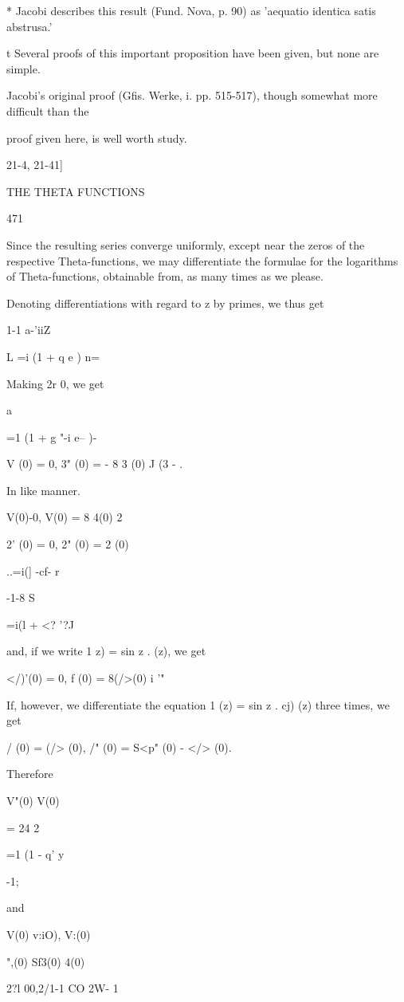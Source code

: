 * Jacobi describes this result (Fund. Nova, p. 90) as 'aequatio
identica satis abstrusa.'

t Several proofs of this important proposition have been given, but
none are simple.

Jacobi's original proof (Gfis. Werke, i. pp. 515-517), though somewhat
more difficult than the

proof given here, is well worth study.

21-4, 21-41]

THE THETA FUNCTIONS

471

Since the resulting series converge uniformly, except near the zeros
of the respective Theta-functions, we may differentiate the formulae
for the logarithms of Theta-functions, obtainable from, as many
times as we please.

Denoting differentiations with regard to z by primes, we thus get


1-1 a-'iiZ

L =i (1 + q e ) n=\

Making 2r 0, we get

a%

=1 (1 + g "-i e-- )-

V (0) = 0, 3" (0) = - 8 3 (0) J (3 - .

In like manner.

V(0)-0, V(0) = 8 4(0) 2

 2' (0) = 0, 2" (0) = 2 (0)

..=i(] -cf- r

-1-8 S

 =i(l + <? '?J

and, if we write 1 z) = sin z . (z), we get

</)'(0) = 0, f (0) = 8(/>(0) i '"

If, however, we differentiate the equation 1 (z) = sin z . cj) (z)
three times, we get

 / (0) = (/> (0), /" (0) = S<p" (0) - </> (0).

Therefore

V"(0) V(0)

= 24 2

=1 (1 - q' y

-1;

and

V(0) v:iO), V:(0)

",(0) Sf3(0) 4(0)

 2?l 00,2/1-1 CO 2W- 1

